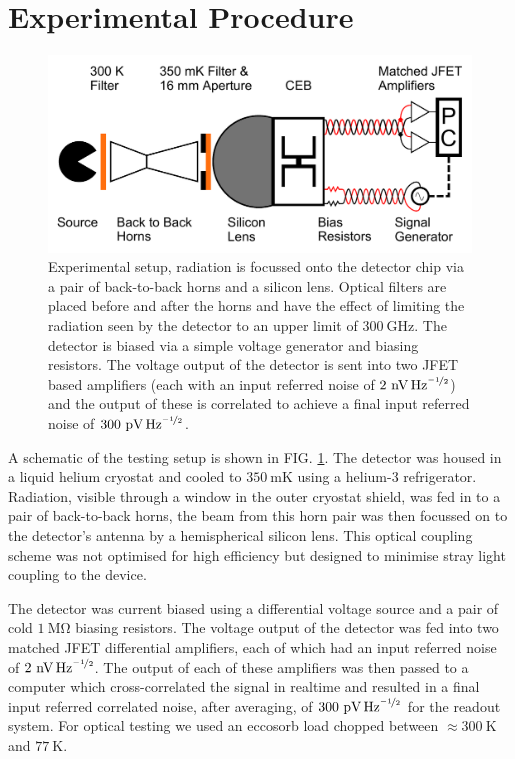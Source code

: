 \documentclass[aip, apl, a4paper, amsmath,amssymb, reprint]{revtex4-1}
\begin{document}
\section{Experimental Procedure}\label{sec:exp_procedure}
\begin{figure}[ht]
\includegraphics[width = 0.8\columnwidth]{experimental_setup}
\caption{Experimental setup, radiation is focussed onto the detector chip via a pair of back-to-back horns and a silicon lens. Optical filters are placed before and after the horns and have the effect of limiting the radiation seen by the detector to an upper limit of $300~\mathrm{GHz}$. The detector is biased via a simple voltage generator and biasing resistors. The voltage output of the detector is sent into two JFET based amplifiers (each with an input referred noise of $2~\mathrm{\mbox{nV\,Hz}^{\nicefrac{-1}{2}}}$) and the output of these is correlated to achieve a final input referred noise of $300~\mathrm{\mbox{pV\,Hz}^{\nicefrac{-1}{2}}}$.}
\label{fig:exp_setup}
\end{figure}

A schematic of the testing setup is shown in FIG. \ref{fig:exp_setup}. The detector was housed in a liquid helium cryostat and cooled to $350~\mathrm{mK}$ using a helium-3 refrigerator. Radiation, visible through a window in the outer cryostat shield, was fed in to a pair of back-to-back horns, the beam from this horn pair was then focussed on to the detector's antenna by a hemispherical silicon lens. This optical coupling scheme was not optimised for high efficiency but designed to minimise stray light coupling to the device.

The detector was current biased using a differential voltage source and a pair of cold $1~\mathrm{M\Omega}$ biasing resistors. The voltage output of the detector was fed into two matched JFET differential amplifiers, each of which had an input referred noise of $2~\mathrm{\mbox{nV\,Hz}^{\nicefrac{-1}{2}}}$. The output of each of these amplifiers was then passed to a computer which cross-correlated the signal in realtime and resulted in a final input referred correlated noise, after averaging, of $300~\mathrm{\mbox{pV\,Hz}^{\nicefrac{-1}{2}}}$ for the readout system. For optical testing we used an eccosorb load chopped between $\approx 300~\mathrm{K}$ and $77~\mathrm{K}$.
\end{document}
